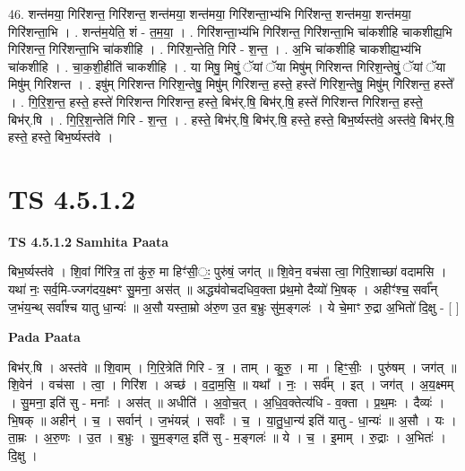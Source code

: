 \documentclass[17pt]{extarticle}
\begin{document}
46. शन्त॑मया॒ गिरि॑शन्त॒ गिरि॑शन्त॒ शन्त॑मया॒ शन्त॑मया॒ गिरि॑शन्ता॒भ्य॑भि गिरि॑शन्त॒ शन्त॑मया॒ शन्त॑मया॒ गिरि॑शन्ता॒भि । . शन्त॑म॒येति॒ शं - त॒म॒या॒ । . गिरि॑शन्ता॒भ्य॑भि गिरि॑शन्त॒ गिरि॑शन्ता॒भि चा॑कशीहि चाकशीह्य॒भि गिरि॑शन्त॒ गिरि॑शन्ता॒भि चा॑कशीहि । . गिरि॑श॒न्तेति॒ गिरि॑ - श॒न्त॒ । . अ॒भि चा॑कशीहि चाकशीह्य॒भ्य॑भि चा॑कशीहि । . चा॒क॒शी॒हीति॑ चाकशीहि । . या मिषु॒ मिषुं॒ ॅयां ॅया मिषु॑म् गिरिशन्त गिरिश॒न्तेषुं॒ ॅयां ॅया मिषु॑म् गिरिशन्त । . इषु॑म् गिरिशन्त गिरिश॒न्तेषु॒ मिषु॑म् गिरिशन्त॒ हस्ते॒ हस्ते॑ गिरिश॒न्तेषु॒ मिषु॑म् गिरिशन्त॒ हस्ते᳚ । . गि॒रि॒श॒न्त॒ हस्ते॒ हस्ते॑ गिरिशन्त गिरिशन्त॒ हस्ते॒ बिभ॑र्.षि॒ बिभ॑र्.षि॒ हस्ते॑ गिरिशन्त गिरिशन्त॒ हस्ते॒ बिभ॑र्.षि । . गि॒रि॒श॒न्तेति॑ गिरि - श॒न्त॒ । . हस्ते॒ बिभ॑र्.षि॒ बिभ॑र्.षि॒ हस्ते॒ हस्ते॒ बिभ॒र्ष्यस्त॑वे॒ अस्त॑वे॒ बिभ॑र्.षि॒ हस्ते॒ हस्ते॒ बिभ॒र्ष्यस्त॑वे । \newline
\pagebreak
{}

\section{ TS 4.5.1.2 }

\textbf{TS 4.5.1.2 } \newline
\textbf{Samhita Paata} \newline

बिभ॒र्ष्यस्त॑वे । शि॒वां गि॑रित्र॒ तां कु॑रु॒ मा हिꣳ॑सी॒ः॒ पुरु॑षं॒ जग॑त् ॥        शि॒वेन॒ वच॑सा त्वा॒ गिरि॒शाच्छा॑ वदामसि ।यथा॑ नः॒ सर्व॒मि-ज्जग॑दय॒क्ष्मꣳ सु॒मना॒ अस॑त् ॥                             अद्ध्य॑वोचदधिव॒क्ता प्र॑थ॒मो दैव्यो॑ भि॒षक् । अहीꣳ॑श्च॒॒ सर्वा᳚न् ज॒भंय॒न्थ् सर्वा᳚श्च यातु धा॒न्यः॑ ॥                          अ॒सौ यस्ता॒म्रो अ॑रु॒ण उ॒त ब॒भ्रुः सु॑म॒ङ्गलः॑ । ये चे॒माꣳ रु॒द्रा अ॒भितो॑ दि॒क्षु - [  ] \newline

\textbf{Pada Paata} \newline

बिभ॑र्.षि । अस्त॑वे ॥ शि॒वाम् । गि॒रि॒त्रेति॑ गिरि - त्र॒ । ताम् । कु॒रु॒ । मा । हिꣳ॒॒सीः॒ । पुरु॑षम् । जग॑त् ॥ शि॒वेन॑ । वच॑सा । त्वा॒ । गिरि॑श । अच्छ॑ । व॒दा॒म॒सि॒ ॥ यथा᳚ । नः॒ । सर्व᳚म् । इत् । जग॑त् । अ॒य॒क्ष्मम् । सु॒मना॒ इति॑ सु - मनाः᳚ । अस॑त् ॥ अधीति॑ । अ॒वो॒च॒त् । अ॒धि॒व॒क्तेत्य॑धि - व॒क्ता । प्र॒थ॒मः । दैव्यः॑ । भि॒षक् ॥ अहीन्॑ । च॒ । सर्वान्॑ । ज॒भंयन्न्॑ । सर्वाः᳚ । च॒ । या॒तु॒धा॒न्य॑ इति॑ यातु - धा॒न्यः॑ ॥ अ॒सौ । यः । ता॒म्रः । अ॒रु॒णः । उ॒त । ब॒भ्रुः । सु॒म॒ङ्गल॒ इति॑ सु - म॒ङ्गलः॑ ॥ ये । च॒ । इ॒माम् । रु॒द्राः । अ॒भितः॑ । दि॒क्षु ।  \newline
\end{document}
